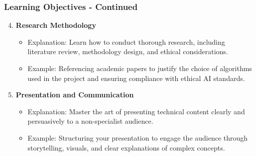 \documentclass{beamer}
\begin{document}
\begin{frame}[fragile]
    \frametitle{Learning Objectives - Continued}
    \begin{enumerate}
        \setcounter{enumi}{3} %
        \item \textbf{Research Methodology}  
            \begin{itemize}
                \item Explanation: Learn how to conduct thorough research, including literature review, methodology design, and ethical considerations.
                \item Example: Referencing academic papers to justify the choice of algorithms used in the project and ensuring compliance with ethical AI standards.
            \end{itemize}

        \item \textbf{Presentation and Communication}
            \begin{itemize}
                \item Explanation: Master the art of presenting technical content clearly and persuasively to a non-specialist audience.
                \item Example: Structuring your presentation to engage the audience through storytelling, visuals, and clear explanations of complex concepts.
            \end{itemize}
    \end{enumerate}
\end{frame}
\end{document}
